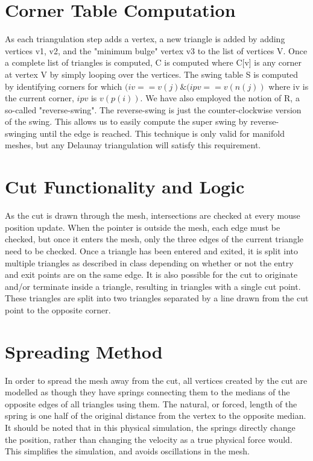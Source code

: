 \documentclass[letterpaper,10pt]{IEEEtran}
\begin{document}
\section{Corner Table \cite{Rossignac04compressingvolumes} Computation}
As each triangulation step adds a vertex, a new triangle is added by adding vertices v1, v2, and the "minimum bulge" vertex v3 to the list of vertices V.  Once a complete list of triangles is computed, C is computed where C[v] is any corner at vertex V by simply looping over the vertices.  The swing table S is computed by identifying corners for which $(iv == v(j) \& (ipv == v(n(j))$ where iv is the current corner, $ipv$ is $v(p(i))$.   We have also employed the notion of R, a so-called "reverse-swing".  The reverse-swing is just the counter-clockwise version of the swing.  This allows us to easily compute the super swing by reverse-swinging until the edge is reached.  This technique is only valid for manifold meshes, but any Delaunay triangulation will satisfy this requirement.

\section{Cut Functionality and Logic}
As the cut is drawn through the mesh, intersections are checked at every mouse position update.
When the pointer is outside the mesh, each edge must be checked, but once it enters the mesh, only the three edges of the current triangle need to be checked.
Once a triangle has been entered and exited, it is split into multiple triangles as described in class depending on whether or not the entry and exit points are on the same edge.
It is also possible for the cut to originate and/or terminate inside a triangle, resulting in triangles with a single cut point.
These triangles are split into two triangles separated by a line drawn from the cut point to the opposite corner.

\section{Spreading Method}
In order to spread the mesh away from the cut, all vertices created by the cut are modelled as though they have springs connecting them to the medians of the opposite edges of all triangles using them.
The natural, or forced, length of the spring is one half of the original distance from the vertex to the opposite median.
It should be noted that in this physical simulation, the springs directly change the position, rather than changing the velocity as a true physical force would.
This simplifies the simulation, and avoids oscillations in the mesh.
\end{document}
